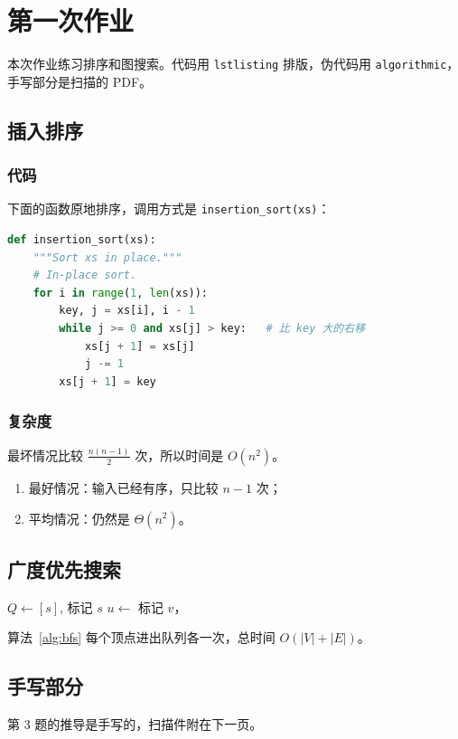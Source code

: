 \chapter{第一次作业}\label{chap:hw1}

本次作业练习排序和图搜索。代码用 \lstinline|lstlisting| 排版，伪代码用
\texttt{algorithmic}，手写部分是扫描的 PDF。

\section{插入排序}\label{sec:insertion}

\subsection{代码}

下面的函数原地排序，调用方式是 \lstinline{insertion_sort(xs)}：
\begin{lstlisting}[language=Python,caption={插入排序 Insertion sort}]
def insertion_sort(xs):
    """Sort xs in place."""
    # In-place sort.
    for i in range(1, len(xs)):
        key, j = xs[i], i - 1
        while j >= 0 and xs[j] > key:   # 比 key 大的右移
            xs[j + 1] = xs[j]
            j -= 1
        xs[j + 1] = key
\end{lstlisting}

\subsection{复杂度}

最坏情况比较 $\frac{n(n-1)}{2}$ 次，所以时间是 $O(n^2)$。

\begin{enumerate}
  \item 最好情况：输入已经有序，只比较 $n-1$ 次；
  \item 平均情况：仍然是 $\Theta(n^2)$。
\end{enumerate}

\section{广度优先搜索}\label{sec:bfs}

\begin{algorithm}
  \caption{广度优先搜索 BFS}\label{alg:bfs}
  \begin{algorithmic}[1]
      \State $Q \gets [s]$, 标记 $s$
        \State $u \gets$ 
           \State 标记 $v$， \EndIf
        \EndFor
      \EndWhile
    \EndProcedure
  \end{algorithmic}
\end{algorithm}

算法~\ref{alg:bfs} 每个顶点进出队列各一次，总时间 $O(|V| + |E|)$。

\section{手写部分}\label{sec:scan}

第 3 题的推导是手写的，扫描件附在下一页。


